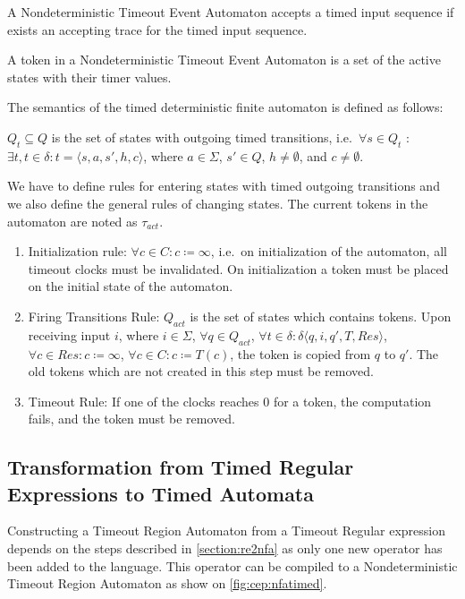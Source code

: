 				\begin{dfn}
					\label{dfn:cep:tea:accepting}
					A Nondeterministic Timeout Event Automaton accepts a timed input sequence if exists an accepting trace for the timed input sequence.
				\end{dfn}
				
				\begin{dfn}
					\label{dfn:cep:tea:token}
					A token in a Nondeterministic Timeout Event Automaton is a set of the active states with their timer values.
				\end{dfn}
				
				The semantics of the timed deterministic finite automaton is defined as follows:
				
				
				$Q_t \subseteq Q$ is the set of states with outgoing timed transitions, 
				i.e.~$\forall s \in Q_t$ : $ \exists t, t \in \delta \colon t = \langle s, a, s', h, c \rangle$, where $a \in \Sigma$, $s' \in Q$, $h \neq \emptyset$, and $c \neq \emptyset$.
				
				We have to define rules for entering states with timed outgoing transitions and we also define the general rules of changing states. 
				The current tokens in the automaton are noted as $\tau_{act}$.
				
				\begin{enumerate}
					\item Initialization rule: 
						$\forall c \in C \colon c \coloneqq \infty$, i.e.~on initialization of the automaton, all timeout clocks must be invalidated.
						On initialization a token must be placed on the initial state of the automaton.
					\item Firing Transitions Rule:
						$Q_{act}$ is the set of states which contains tokens.
						Upon receiving input $i$, where $i \in \Sigma$, $\forall q \in Q_{act}$, $\forall t \in \delta \colon \delta \langle q, i, q', T, \mathit{Res} \rangle$,
						$\forall c \in \mathit{Res} \colon c \coloneqq \infty$,
						$\forall c \in C \colon c \coloneqq T(c)$,
						the token is copied from $q$ to $q'$.
						The old tokens which are not created in this step must be removed.
					\item Timeout Rule:
						If one of the clocks reaches 0 for a token, the computation fails, and the token must be removed.
				\end{enumerate}
	
		\subsection{Transformation from Timed Regular Expressions to Timed Automata}
			\label{section:tre2tnfa}	
			Constructing a Timeout Region Automaton from a Timeout Regular expression depends on the steps described in \cref{section:re2nfa} as only one new operator has been added to the language.
			This operator can be compiled to a Nondeterministic Timeout Region Automaton as show on \cref{fig:cep:nfatimed}. 
			
